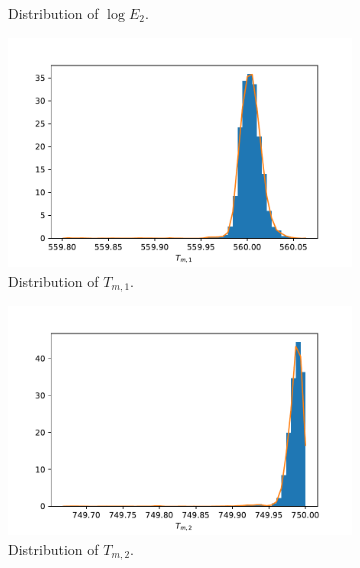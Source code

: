 \begin{figure}[h!]
\begin{subfigure}{.5\textwidth}
  \caption{Distribution of $\log E_2$.}
  \label{fig:subhistE2}
\end{subfigure}
\newline
\begin{subfigure}{.5\textwidth}
  \centering
  \includegraphics[width=\linewidth]{figures/bayesian/SIM_Q/hist_Tm1.pdf}
  \caption{Distribution of $T_{m,1}$.}
  \label{fig:subhistTm1}
\end{subfigure}%
\begin{subfigure}{.5\textwidth}
  \centering
  \includegraphics[width=\linewidth]{figures/bayesian/SIM_Q/hist_Tm2.pdf}
  \caption{Distribution of $T_{m,2}$.}
  \label{fig:subhistTm2}
\end{subfigure}
\newline
\begin{subfigure}{.5\textwidth}
  \centering

\end{subfigure}
\end{figure}
